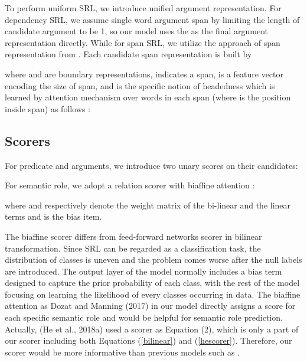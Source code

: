 \documentclass[letterpaper]{article} \usepackage{aaai19}  \usepackage{times}  \usepackage{helvet}  \usepackage{courier}  \usepackage{url}  \usepackage{graphicx}  \frenchspacing  \setlength{\pdfpagewidth}{8.5in}  \setlength{\pdfpageheight}{11in}
\begin{document}
To  perform uniform SRL, we introduce unified argument representation. For dependency SRL, we assume single word argument span by limiting the length of candidate argument to be 1, so our model uses the  as the final argument representation  directly. While for span SRL, we utilize the approach of span representation from \citeauthor{lee2017end} . Each candidate span representation  is built by

where   and  are boundary representations,  indicates a span,  is a feature vector encoding the size of span, and  is the specific notion of headedness which is learned by attention mechanism \cite{bahdanau2014neural} over words in each span (where  is the position inside span) as follows :
 






\subsection{Scorers}For predicate and arguments, we introduce two unary scores on their candidates:


For semantic role,
we adopt a relation scorer with biaffine attention \cite{dozat2017deep}:

where  and  respectively denote the weight matrix of the bi-linear and the linear terms and  is the bias item.

The biaffine scorer differs from feed-forward networks scorer in bilinear transformation. Since SRL can be regarded as a classification task, the distribution of classes is uneven and the problem comes worse after the null labels are introduced. The output layer of the model normally includes a bias term designed to capture the prior probability of each class, with the rest of the model focusing on learning the likelihood of every classes occurring in data. 
The biaffine attention as Dozat and Manning (2017) in our model directly assigns a score for each specific semantic role and would be helpful for semantic role prediction. Actually, (He et al., 2018a) used a scorer as Equation (2), which is only a part of our scorer including both Equations (\ref{bilinear}) and (\ref{hescorer}). Therefore, our scorer would be more informative than previous models such as \cite{he2018jointly}.
\end{document}
